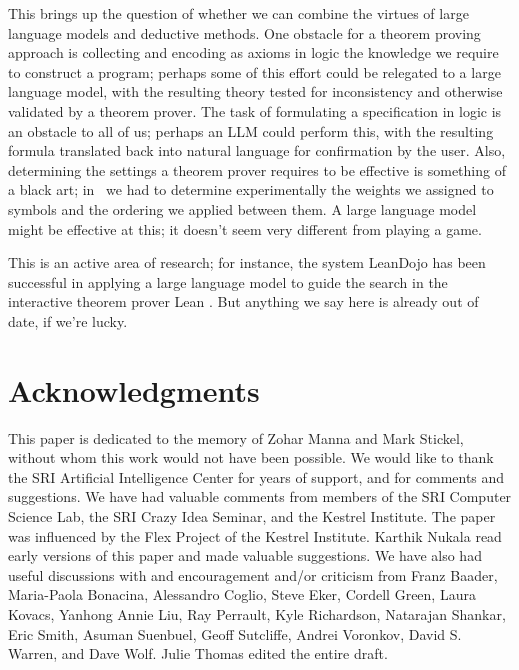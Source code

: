 \documentclass[runningheads]{llncs}
\begin{document}
This brings up the question of whether we can combine the virtues of large language models and deductive methods.
One obstacle for a theorem proving approach is collecting and encoding as axioms in logic the knowledge we require to construct a program; perhaps some of this effort could be relegated to a large language model, with the resulting theory tested for inconsistency and otherwise validated by a theorem prover. The task of formulating a specification in logic is an obstacle to all of us; perhaps an LLM could perform this, with the resulting formula translated back into natural language for confirmation by the user.  Also,  determining the settings a theorem prover requires to be effective is something of a black art; in \SNARK\ we had to determine experimentally the weights we assigned to symbols and the ordering we applied between them.  A large language model might be effective at this; it doesn't seem very different from playing a game.  

This is an active area of research; for instance, the system LeanDojo \citep{leandojo} has been successful in applying a large language model to guide the search in the interactive theorem prover Lean \citep{lean}.  But anything we say here is already out of date, if we're lucky.

\section{Acknowledgments}

This paper is dedicated to the memory of Zohar Manna and Mark Stickel, without whom this work would not have been possible.  We would like to thank the SRI Artificial Intelligence Center for years of support, and for comments and suggestions.  We have had valuable comments from members of the SRI Computer Science Lab, the SRI Crazy Idea Seminar, and the Kestrel Institute.  The paper was influenced by the Flex Project of the Kestrel Institute.  Karthik Nukala read early versions of this paper and made valuable suggestions. We have also had useful discussions with and encouragement and/or criticism from Franz Baader, Maria-Paola Bonacina, Alessandro Coglio, Steve Eker, Cordell Green, Laura Kovacs, Yanhong Annie Liu, Ray Perrault, Kyle Richardson, Natarajan Shankar, Eric Smith, Asuman Suenbuel, Geoff Sutcliffe, Andrei Voronkov, David S. Warren, and Dave Wolf.  Julie Thomas edited the entire draft.
\end{document}
